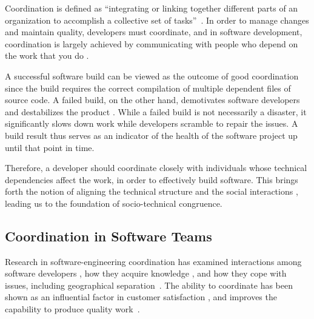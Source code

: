 Coordination is defined as ``integrating or linking together different parts of an organization to accomplish a collective set of tasks''~\cite{vandeven1976}. In order to manage changes and maintain quality, developers must coordinate, and in software development, coordination is largely achieved by communicating with people who depend on the work that you do \cite{kraut:1995coordination}.

A successful software build can be viewed as the outcome of good coordination since the build requires the correct compilation of multiple dependent files of source code.
A failed build, on the other hand, demotivates software developers \cite{holck2004,damian:icgse:2007} and destabilizes the product \cite{cusumano1997}.
While a failed build is not necessarily a disaster, it significantly slows down work while developers scramble to repair the issues.
A build result thus serves as an indicator of the health of the software project up until that point in time.

Therefore, a developer should coordinate closely with individuals whose technical dependencies affect the work, in order to effectively build software. This brings forth the notion of aligning the technical structure and the social interactions \cite{herbsleb2007:fose}, leading us to the foundation of socio-technical congruence.

\vspace{8pt}
\subsection{Coordination in Software Teams}
\vspace{5pt}
Research in software-engineering coordination has examined interactions among
software developers \cite{carter2004,marczak:re:2008}, how they acquire
knowledge \cite{ehrlich:icgse:2006,nakakoji2010:rdc}, and
how they cope with issues, including geographical
separation~\cite{espinosa2007:team_knowledge,herbsleb2003:speed}.
The ability to coordinate has
been shown as an influential factor in customer satisfaction \cite{kraut:1995coordination}, and  improves the capability to produce quality work~\cite{faraj2000}.


